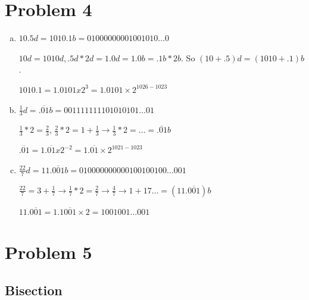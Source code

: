 \documentclass[11pt]{article} %
\begin{document}
\section*{Problem 4}
\begin{enumerate}[a.)]
\item $10.5d = 1010.1b = 01000000001001010\ldots0$
\par $10d = 1010d, .5d * 2d = 1.0d = 1.0b = .1b * 2b$. So $(10+.5)d = (1010 + .1)b$.
\par $1010.1 = 1.0101 x 2^3 = 1.0101 \times 2^{1026 - 1023}$
\item $\frac{1}{3}d = \overline{.01}b = 001111111101010101\ldots01$
\par $\frac{1}{3} * 2 = \frac{2}{3}$, $\frac{2}{3} * 2 = 1 + \frac{1}{3} \rightarrow \frac{1}{3} * 2 = \ldots = \overline{.01}b$
\par $\overline{.01} = 1.\overline{01} x 2^{-2} = 1.\overline{01} \times 2^{1021 - 1023}$
\item $\frac{22}{7}d = 11.\overline{001}b = 010000000000100100100\ldots001$
\par $\frac{22}{7} = 3 + \frac{1}{7} \rightarrow \frac{1}{7} * 2 = \frac{2}{7} \rightarrow \frac{4}{7} \rightarrow 1 + {1}{7} \ldots = (11.\overline{001})b$
\par $11.\overline{001} = 1.1\overline{001} \times 2 = 1001001 \ldots 001$
\end{enumerate}

\section*{Problem 5}

\subsection*{Bisection}
\end{document}
